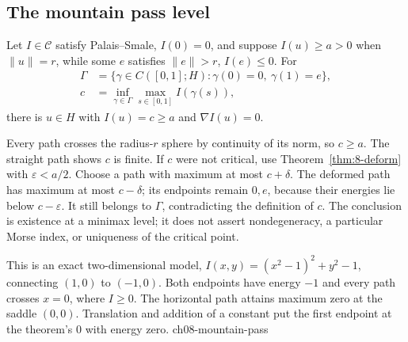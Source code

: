 \Needspace{45mm}
\subsection{The mountain pass level}
\Needspace{55mm}
\begin{theorem}
\label{thm:8-mountain}
Let $I\in\mathcal C$ satisfy Palais--Smale, $I(0)=0$, and suppose
$I(u)\geq a>0$ when $\|u\|=r$, while some $e$ satisfies
$\|e\|>r$, $I(e)\leq0$. For
\[
 \begin{split}
 \Gamma&=\{\gamma\in C([0,1];H):\gamma(0)=0,\ \gamma(1)=e\},\\
 c&=\inf_{\gamma\in\Gamma}\max_{s\in[0,1]}I(\gamma(s)),
 \end{split}
\]
there is $u\in H$ with $I(u)=c\geq a$ and $\nabla I(u)=0$.
\end{theorem}
\begin{expandedproof}
Every path crosses the radius-$r$ sphere by continuity of its norm, so
$c\geq a$. The straight path shows $c$ is finite.
If $c$ were not critical, use Theorem~\ref{thm:8-deform} with
$\varepsilon<a/2$. Choose a path with maximum at most $c+\delta$.
The deformed path has maximum at most $c-\delta$; its endpoints remain
$0,e$, because their energies lie below $c-\varepsilon$.
It still belongs to $\Gamma$, contradicting the definition of $c$.
The conclusion is existence at a minimax level; it does not assert
nondegeneracy, a particular Morse index, or uniqueness of the critical point.
\end{expandedproof}

{This is an exact two-dimensional model, $I(x,y)=(x^2-1)^2+y^2-1$, connecting $(1,0)$ to $(-1,0)$. Both endpoints have energy $-1$ and every path crosses $x=0$, where $I\geq0$. The horizontal path attains maximum zero at the saddle $(0,0)$. Translation and addition of a constant put the first endpoint at the theorem's $0$ with energy zero.}
{ch08-mountain-pass}

\Needspace{45mm}
